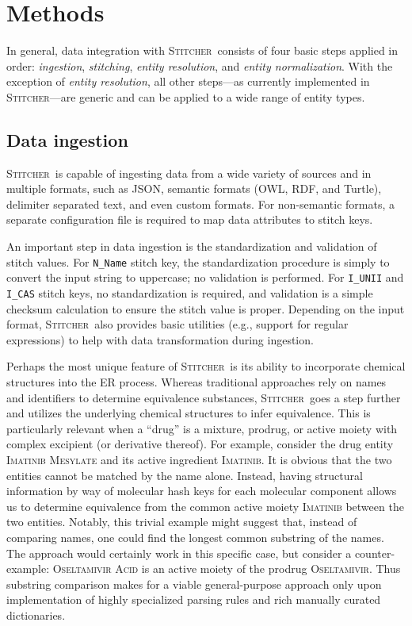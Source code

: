 \documentclass{bmcart}
\newcommand\st{\textsc{Stitcher}}
\begin{document}
\section*{Methods}\label{sec:methods}
In general, data integration with \st\ consists of four basic
steps applied in order: \emph{ingestion}, \emph{stitching},
\emph{entity resolution}, and \emph{entity normalization}. With
the exception of \emph{entity resolution}, all other steps---as 
currently implemented in \st---are generic and can be applied to a
wide range of entity types.

\subsection*{Data ingestion}\label{sec:methods-ingest}
\st\ is capable of ingesting data from a wide variety of sources and
in multiple formats, such as JSON, semantic formats (OWL, RDF, and Turtle), 
delimiter separated text, and even custom formats. For non-semantic formats, 
a separate configuration file is required to map data attributes to
stitch keys.

An important step in data ingestion is the standardization and
validation of stitch values. For \texttt{N\_Name} stitch key, the
standardization procedure is simply to convert the input string to
uppercase; no validation is performed. For \texttt{I\_UNII}
and \texttt{I\_CAS} stitch keys, no standardization is required, and
validation is a simple checksum calculation to ensure the stitch value
is proper. Depending on the input format, \st\ also provides basic
utilities (e.g., support for regular expressions) to help with data
transformation during ingestion. 

Perhaps the most unique feature of \st\ is its ability to incorporate
chemical structures into the ER process. Whereas
traditional approaches rely on names and identifiers to determine
equivalence substances, \st\ goes a step further and utilizes the
underlying chemical structures to infer equivalence. This 
is particularly relevant when a ``drug'' is a mixture, prodrug, or
active moiety with complex excipient (or derivative thereof). For
example, consider the drug entity \textsc{Imatinib Mesylate} and its
active ingredient \textsc{Imatinib}. It is obvious that the two
entities cannot be matched by the name alone. Instead, having structural
information by way of molecular hash keys for each molecular component
allows us to determine equivalence from the common active
moiety \textsc{Imatinib} between the two entities. Notably, this
trivial example might suggest that, instead of comparing names, one
could find the longest common substring of the names. The approach
would certainly work in this specific case, but consider a
counter-example: \textsc{Oseltamivir Acid} is an active moiety of the
prodrug \textsc{Oseltamivir}. Thus substring comparison makes for a
viable general-purpose approach only upon implementation of highly
specialized parsing rules and rich manually curated dictionaries. 
\end{document}
